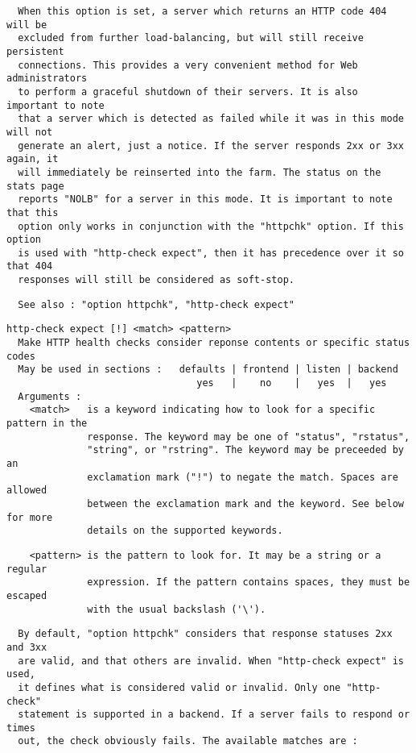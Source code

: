 \begin{verbatim}
  When this option is set, a server which returns an HTTP code 404 will be
  excluded from further load-balancing, but will still receive persistent
  connections. This provides a very convenient method for Web administrators
  to perform a graceful shutdown of their servers. It is also important to note
  that a server which is detected as failed while it was in this mode will not
  generate an alert, just a notice. If the server responds 2xx or 3xx again, it
  will immediately be reinserted into the farm. The status on the stats page
  reports "NOLB" for a server in this mode. It is important to note that this
  option only works in conjunction with the "httpchk" option. If this option
  is used with "http-check expect", then it has precedence over it so that 404
  responses will still be considered as soft-stop.
\end{verbatim}

\begin{verbatim}
  See also : "option httpchk", "http-check expect"
\end{verbatim}

\begin{verbatim}
http-check expect [!] <match> <pattern>
  Make HTTP health checks consider reponse contents or specific status codes
  May be used in sections :   defaults | frontend | listen | backend
                                 yes   |    no    |   yes  |   yes
  Arguments :
    <match>   is a keyword indicating how to look for a specific pattern in the
              response. The keyword may be one of "status", "rstatus",
              "string", or "rstring". The keyword may be preceeded by an
              exclamation mark ("!") to negate the match. Spaces are allowed
              between the exclamation mark and the keyword. See below for more
              details on the supported keywords.
\end{verbatim}

\begin{verbatim}
    <pattern> is the pattern to look for. It may be a string or a regular
              expression. If the pattern contains spaces, they must be escaped
              with the usual backslash ('\').
\end{verbatim}

\begin{verbatim}
  By default, "option httpchk" considers that response statuses 2xx and 3xx
  are valid, and that others are invalid. When "http-check expect" is used,
  it defines what is considered valid or invalid. Only one "http-check"
  statement is supported in a backend. If a server fails to respond or times
  out, the check obviously fails. The available matches are :
\end{verbatim}

